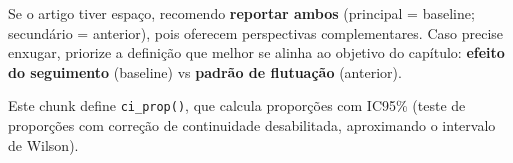\documentclass[
]{article}
\newenvironment{Shaded}{\begin{snugshade}}{\end{snugshade}}
\newcommand{\AttributeTok}[1]{\textcolor[rgb]{0.40,0.45,0.13}{#1}}
\newcommand{\CommentTok}[1]{\textcolor[rgb]{0.37,0.37,0.37}{#1}}
\newcommand{\ConstantTok}[1]{\textcolor[rgb]{0.56,0.35,0.01}{#1}}
\newcommand{\ControlFlowTok}[1]{\textcolor[rgb]{0.00,0.23,0.31}{\textbf{#1}}}
\newcommand{\DecValTok}[1]{\textcolor[rgb]{0.68,0.00,0.00}{#1}}
\newcommand{\FloatTok}[1]{\textcolor[rgb]{0.68,0.00,0.00}{#1}}
\newcommand{\FunctionTok}[1]{\textcolor[rgb]{0.28,0.35,0.67}{#1}}
\newcommand{\NormalTok}[1]{\textcolor[rgb]{0.00,0.23,0.31}{#1}}
\newcommand{\OtherTok}[1]{\textcolor[rgb]{0.00,0.23,0.31}{#1}}
\newcommand{\SpecialCharTok}[1]{\textcolor[rgb]{0.37,0.37,0.37}{#1}}
\begin{document}
Se o artigo tiver espaço, recomendo \textbf{reportar ambos} (principal =
baseline; secundário = anterior), pois oferecem perspectivas
complementares. Caso precise enxugar, priorize a definição que melhor se
alinha ao objetivo do capítulo: \textbf{efeito do seguimento} (baseline)
vs \textbf{padrão de flutuação} (anterior).

\begin{Shaded}
\end{Shaded}

Este chunk define \texttt{ci\_prop()}, que calcula proporções com IC95\%
(teste de proporções com correção de continuidade desabilitada,
aproximando o intervalo de Wilson).
\end{document}
